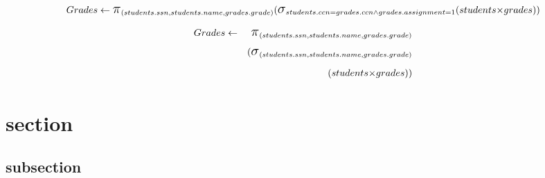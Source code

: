 \documentclass[]{article}
\newcommand{\select}{\mbox{\Large$\sigma$}}
\newcommand{\cross}{\mbox{$\times$}}
\newcommand{\project}{\mbox{\Large$\pi$}}
\begin{document}
\begin{displaymath}
Grades \leftarrow \project_{(students.ssn, students.name, grades.grade)} \\
(\select_{students.ccn = grades.ccn \wedge grades.assignment = 1} \\
(students \cross grades)) \\
\end{displaymath}

\begin{eqnarray*}
Grades & \leftarrow & \project_{(students.ssn, students.name, grades.grade)}  \\
       &            &(\select_{(students.ssn, students.name, grades.grade)}  \\
       &            &          (students \cross grades)) 
\end{eqnarray*}

\section{section}
	\subsection{subsection}
\end{document}

